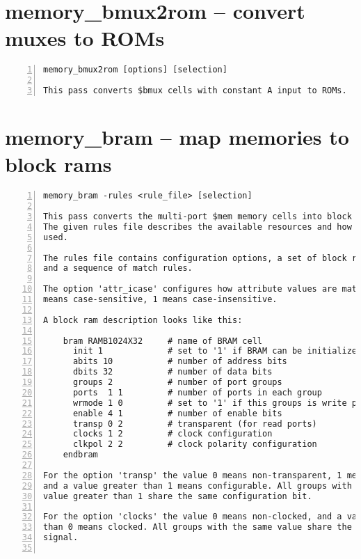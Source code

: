 \section{memory\_bmux2rom -- convert muxes to ROMs}
\label{cmd:memory_bmux2rom}
\begin{lstlisting}[numbers=left,frame=single]
    memory_bmux2rom [options] [selection]

This pass converts $bmux cells with constant A input to ROMs.
\end{lstlisting}

\section{memory\_bram -- map memories to block rams}
\label{cmd:memory_bram}
\begin{lstlisting}[numbers=left,frame=single]
    memory_bram -rules <rule_file> [selection]

This pass converts the multi-port $mem memory cells into block ram instances.
The given rules file describes the available resources and how they should be
used.

The rules file contains configuration options, a set of block ram description
and a sequence of match rules.

The option 'attr_icase' configures how attribute values are matched. The value 0
means case-sensitive, 1 means case-insensitive.

A block ram description looks like this:

    bram RAMB1024X32     # name of BRAM cell
      init 1             # set to '1' if BRAM can be initialized
      abits 10           # number of address bits
      dbits 32           # number of data bits
      groups 2           # number of port groups
      ports  1 1         # number of ports in each group
      wrmode 1 0         # set to '1' if this groups is write ports
      enable 4 1         # number of enable bits
      transp 0 2         # transparent (for read ports)
      clocks 1 2         # clock configuration
      clkpol 2 2         # clock polarity configuration
    endbram

For the option 'transp' the value 0 means non-transparent, 1 means transparent
and a value greater than 1 means configurable. All groups with the same
value greater than 1 share the same configuration bit.

For the option 'clocks' the value 0 means non-clocked, and a value greater
than 0 means clocked. All groups with the same value share the same clock
signal.


\end{lstlisting}
